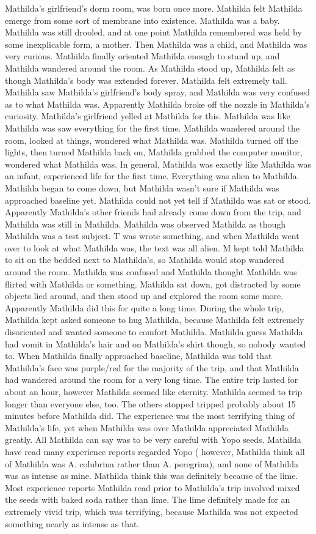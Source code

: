 \documentclass[12pt]{book}
\begin{document}
Mathilda's girlfriend's dorm room, was born once more. Mathilda felt Mathilda emerge from some sort of membrane into existence. Mathilda was a baby. Mathilda was still drooled, and at one point Mathilda remembered was held by some inexplicable form, a mother. Then Mathilda was a child, and Mathilda was very curious. Mathilda finally oriented Mathilda enough to stand up, and Mathilda wandered around the room. As Mathilda stood up, Mathilda felt as though Mathilda's body was extended forever. Mathilda felt extremely tall. Mathilda saw Mathilda's girlfriend's body spray, and Mathilda was very confused as to what Mathilda was. Apparently Mathilda broke off the nozzle in Mathilda's curiosity. Mathilda's girlfriend yelled at Mathilda for this. Mathilda was like Mathilda was saw everything for the first time. Mathilda wandered around the room, looked at things, wondered what Mathilda was. Mathilda turned off the lights, then turned Mathilda back on, Mathilda grabbed the computer monitor, wondered what Mathilda was. In general, Mathilda was exactly like Mathilda was an infant, experienced life for the first time. Everything was alien to Mathilda. Mathilda began to come down, but Mathilda wasn't sure if Mathilda was approached baseline yet. Mathilda could not yet tell if Mathilda was sat or stood. Apparently Mathilda's other friends had already come down from the trip, and Mathilda was still in Mathilda. Mathilda was observed Mathilda as though Mathilda was a test subject. T was wrote something, and when Mathilda went over to look at what Mathilda was, the text was all alien. M kept told Mathilda to sit on the bedded next to Mathilda's, so Mathilda would stop wandered around the room. Mathilda was confused and Mathilda thought Mathilda was flirted with Mathilda or something. Mathilda sat down, got distracted by some objects lied around, and then stood up and explored the room some more. Apparently Mathilda did this for quite a long time. During the whole trip, Mathilda kept asked someone to hug Mathilda, because Mathilda felt extremely disoriented and wanted someone to comfort Mathilda. Mathilda guess Mathilda had vomit in Mathilda's hair and on Mathilda's shirt though, so nobody wanted to. When Mathilda finally approached baseline, Mathilda was told that Mathilda's face was purple/red for the majority of the trip, and that Mathilda had wandered around the room for a very long time. The entire trip lasted for about an hour, however Mathilda seemed like eternity. Mathilda seemed to trip longer than everyone else, too. The others stopped tripped probably about 15 minutes before Mathilda did. The experience was the most terrifying thing of Mathilda's life, yet when Mathilda was over Mathilda appreciated Mathilda greatly. All Mathilda can say was to be very careful with Yopo seeds. Mathilda have read many experience reports regarded Yopo ( however, Mathilda think all of Mathilda was A. colubrina rather than A. peregrina), and none of Mathilda was as intense as mine. Mathilda think this was definitely because of the lime. Most experience reports Mathilda read prior to Mathilda's trip involved mixed the seeds with baked soda rather than lime. The lime definitely made for an extremely vivid trip, which was terrifying, because Mathilda was not expected something nearly as intense as that. 
\end{document}
